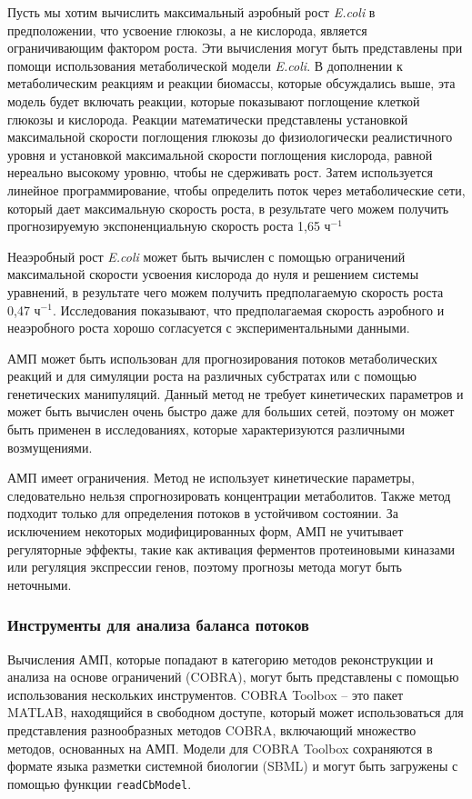\documentclass[a4paper, 12pt]{article}
\begin{document}
Пусть мы хотим вычислить максимальный аэробный рост \textit{E.coli} в предположении, что усвоение глюкозы, а не кислорода, является ограничивающим фактором роста. Эти вычисления могут быть представлены при помощи использования метаболической модели \textit{E.coli}. В дополнении к метаболическим реакциям и реакции биомассы, которые обсуждались выше, эта модель будет включать реакции, которые показывают поглощение клеткой глюкозы и кислорода. Реакции математически представлены установкой максимальной скорости поглощения глюкозы до физиологически реалистичного уровня и установкой максимальной скорости поглощения кислорода, равной нереально высокому уровню, чтобы не сдерживать рост. Затем используется линейное программирование, чтобы определить поток через метаболические сети, который дает максимальную скорость роста, в результате чего можем получить прогнозируемую экспоненциальную скорость роста 1,65 $\textrm{ч}^{-1}$

Неаэробный рост \textit{E.coli} может быть вычислен с помощью ограничений максимальной скорости усвоения кислорода до нуля и решением системы уравнений, в результате чего можем получить предполагаемую скорость роста 0,47 $\textrm{ч}^{-1}$. Исследования показывают, что предполагаемая скорость аэробного и неаэробного роста хорошо согласуется с экспериментальными данными.

АМП может быть использован для прогнозирования потоков метаболических реакций и для симуляции роста на различных субстратах или с помощью генетических манипуляций. Данный метод не требует кинетических параметров и может быть вычислен очень быстро даже для больших сетей, поэтому он может быть применен в исследованиях, которые характеризуются различными возмущениями.

АМП имеет ограничения. Метод не использует кинетические параметры, следовательно нельзя спрогнозировать концентрации метаболитов. Также метод подходит только для определения потоков в устойчивом состоянии. За исключением некоторых модифицированных форм, АМП не учитывает регуляторные эффекты, такие как активация ферментов протеиновыми киназами или регуляция экспрессии генов, поэтому прогнозы метода могут быть неточными.

\subsubsection{Инструменты для анализа баланса потоков}

Вычисления АМП, которые попадают в категорию методов реконструкции и анализа на основе ограничений (COBRA), могут быть представлены с помощью использования нескольких инструментов. COBRA Toolbox – это пакет MATLAB, находящийся в свободном доступе, который может использоваться для представления разнообразных методов COBRA, включающий множество методов, основанных на АМП. Модели для COBRA Toolbox сохраняются в формате языка разметки системной биологии (SBML) и могут быть загружены с помощью функции \texttt{readCbModel}.
\end{document}
